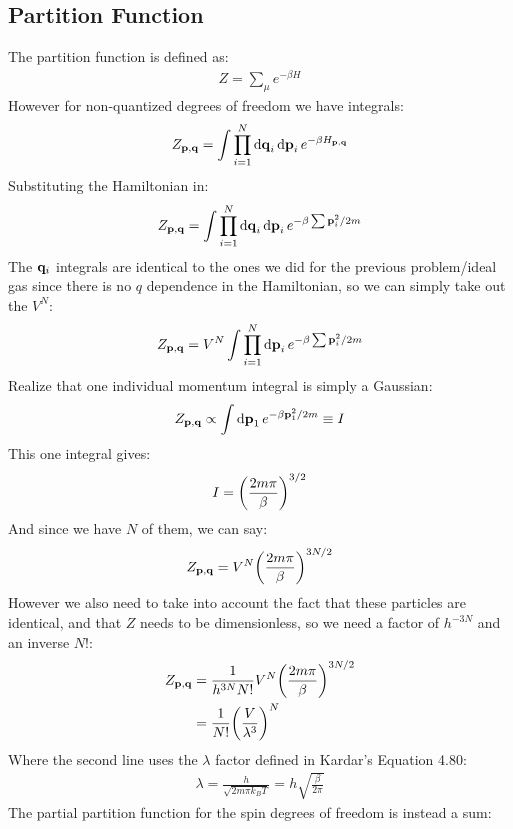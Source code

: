 \documentclass[12pt]{article}
\begin{document}
\subsection{Partition Function}
The partition function is defined as:
\begin{align*}
  Z=\sum_{\mu}e^{-\beta H}
\end{align*}
However for non-quantized degrees of freedom we have integrals:
\begin{align*}
  Z_{\vb{p,q}}=\int\prod_{i=1}^N\dd{\vb{q}}_i\dd{\vb{p}}_ie^{-\beta H_{\vb{p,q}}}
\end{align*}
Substituting the Hamiltonian in:
\begin{align*}
  Z_{\vb{p,q}}=\int\prod_{i=1}^N\dd{\vb{q}}_i\dd{\vb{p}}_i
  e^{-\beta\sum\vb{p}_i^2/2m}
\end{align*}
The $\vb{q}_i$ integrals are identical to the ones we did for the previous problem/ideal gas since there is no $q$ dependence in the Hamiltonian, so we can simply take out the $V^N$:
\begin{align*}
  Z_{\vb{p,q}}=V^N\int\prod_{i=1}^N\dd{\vb{p}}_i
  e^{-\beta\sum\vb{p}_i^2/2m}
\end{align*}
Realize that one individual momentum integral is simply a Gaussian:
\begin{align*}
  Z_{\vb{p,q}}\propto\int\dd{\vb{p}}_1e^{-\beta \vb{p}_1^2/2m}\equiv I
\end{align*}
This one integral gives:
\begin{align*}
  I=\qty(\frac{2m\pi}{\beta})^{3/2}
\end{align*}
And since we have $N$ of them, we can say:
\begin{align*}
  Z_{\vb{p,q}}=V^N\qty(\frac{2m\pi}{\beta})^{3N/2}
\end{align*}
However we also need to take into account the fact that these particles are identical, and that $Z$ needs to be dimensionless, so we need a factor of $h^{-3N}$ and an inverse $N!$:
\begin{align*}
  Z_{\vb{p,q}}&=\frac1{h^{3N}N!}V^N\qty(\frac{2m\pi}{\beta})^{3N/2}\\
  &=\frac1{N!}\qty(\frac{V}{\lambda^3})^N
\end{align*}
Where the second line uses the $\lambda$ factor defined in Kardar's Equation 4.80:
\begin{align*}
  \lambda=\frac{h}{\sqrt{2m\pi k_BT}}=h\sqrt{\frac{\beta}{2\pi}}
\end{align*}
The partial partition function for the spin degrees of freedom is instead a sum:
\end{document}
